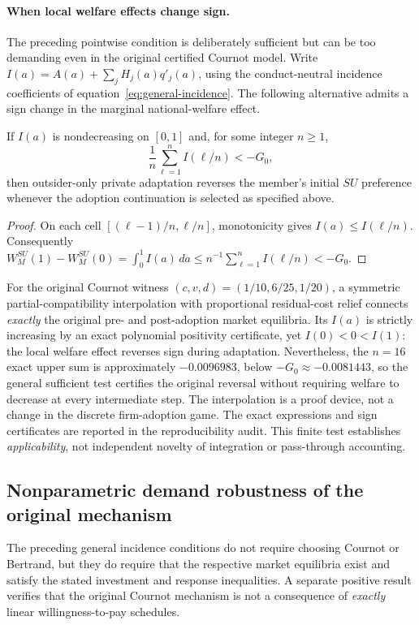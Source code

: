 \paragraph{When local welfare effects change sign.}
The preceding pointwise condition is deliberately sufficient but can be
too demanding even in the original certified Cournot model.  Write
\(I(a)=A(a)+\sum_jH_j(a)q'_j(a)\), using the
conduct-neutral incidence coefficients of
equation~\eqref{eq:general-incidence}.  The following alternative admits
a sign change in the marginal national-welfare effect.

\begin{corollary}
\label{cor:integrated-incidence}
If \(I(a)\) is nondecreasing on \([0,1]\) and, for some integer
\(n\ge1\),
\begin{equation}
  \frac1n\sum_{\ell=1}^{n}I(\ell/n)<-G_0,
  \label{eq:general-integrated-certificate}
\end{equation}
then outsider-only private adaptation reverses the member's
initial \(SU\) preference whenever the adoption continuation is
selected as specified above.
\end{corollary}
\begin{proof}
On each cell \([(\ell-1)/n,\ell/n]\), monotonicity gives
\(I(a)\le I(\ell/n)\).  Consequently
\(W_M^{SU}(1)-W_M^{SU}(0)=\int_0^1 I(a)\,da\le
n^{-1}\sum_{\ell=1}^n I(\ell/n)<-G_0\).
\end{proof}
For the original Cournot witness
\((c,v,d)=(1/10,6/25,1/20)\), a symmetric partial-compatibility
interpolation with proportional residual-cost relief connects
\emph{exactly} the original pre- and post-adoption market equilibria.
Its \(I(a)\) is strictly increasing by an exact polynomial positivity
certificate, yet \(I(0)<0<I(1)\): the local welfare effect reverses
sign during adaptation.  Nevertheless, the \(n=16\) exact upper sum is
approximately \(-0.0096983\), below
\(-G_0\approx-0.0081443\), so the general sufficient test certifies
the original reversal without requiring welfare to decrease at
every intermediate step.  The interpolation is a proof device, not
a change in the discrete firm-adoption game.  The exact expressions
and sign certificates are reported in the reproducibility audit.
This finite test establishes \emph{applicability}, not independent
novelty of integration or pass-through accounting.


\subsection{Nonparametric demand robustness of the original mechanism}
\label{subsec:nonparametric-R15}
The preceding general incidence conditions do not require choosing
Cournot or Bertrand, but they do require that the respective market
equilibria exist and satisfy the stated investment and response
inequalities.  A separate positive result verifies that the original
Cournot mechanism is not a consequence of \emph{exactly} linear
willingness-to-pay schedules.

